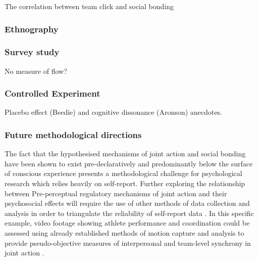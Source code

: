 
The correlation between team click and social bonding




\subsubsection{Ethnography}


\subsubsection{Survey study}


    No measure of flow?

\subsubsection{Controlled Experiment}


    Placebo effect (Beedie) and cognitive dissonance (Aronson) anecdotes.




\subsubsection{Future methodological directions}

The fact that the hypothesised mechanisms of joint action and social bonding have been shown to exist pre-declaratively and predominantly below the surface of conscious experience presents a methodological challenge for psychological research which relies heavily on self-report.  Further exploring the relationship between Pre-perceptual regulatory mechanisms of joint action and their psychosocial effects will require the use of other methods of data collection and analysis in order to triangulate the reliability of self-report data \citep{Newell2014}.  In this specific example, video footage showing athlete performance and coordination could be assessed using already established methods of motion capture and analysis to provide pseudo-objective measures of interpersonal and team-level synchrony in joint action \citep[e.g.][]{Passos2011}.

